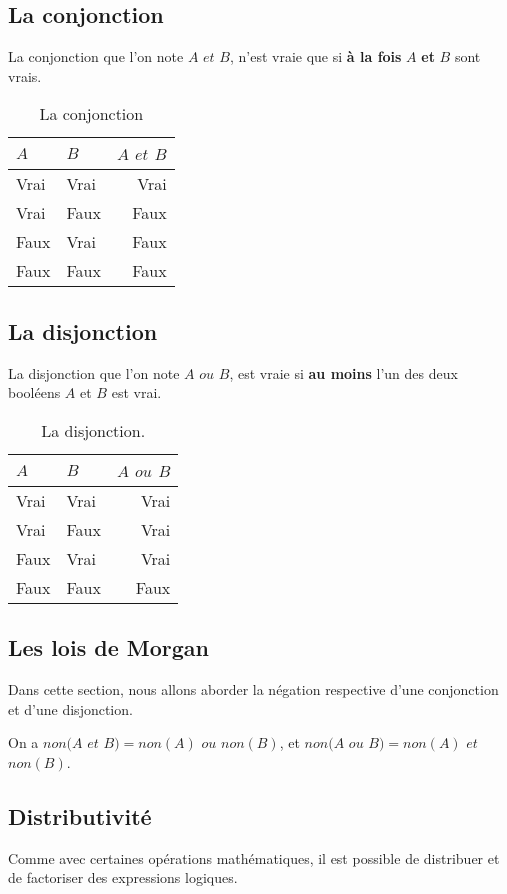 \subsection{La conjonction}
La conjonction que l'on note $A$ $et$ $B$, n'est vraie que si \textbf{à la fois} $A$ \textbf{et} $B$ sont vrais.
\begin{table}[h]
\centering
\begin{tabu} spread \linewidth {|l|l|r|}
\hline
$A$ & $B$ & $A$ $et$ $B$ \\ \hline
Vrai & Vrai & Vrai \\ \hline
Vrai & Faux & Faux \\ \hline
Faux & Vrai & Faux \\ \hline
Faux & Faux & Faux \\ \hline
\end{tabu}
\caption{La conjonction}
\end{table}
\subsection{La disjonction}
La disjonction que l'on note $A$ $ou$ $B$, est vraie si \textbf{au moins} l'un des deux booléens $A$ et $B$ est vrai.
\begin{table}[h]
\centering
\begin{tabu} spread \linewidth {|l|l|r|}
\hline
$A$ & $B$ & $A$ $ou$ $B$ \\ \hline
Vrai & Vrai & Vrai \\ \hline
Vrai & Faux & Vrai \\ \hline
Faux & Vrai & Vrai \\ \hline
Faux & Faux & Faux \\ \hline
\end{tabu}
\caption{La disjonction.}
\end{table}
\subsection{Les lois de Morgan}
Dans cette section, nous allons aborder la négation respective d'une conjonction et d'une disjonction.

On a $non(A$ $et$ $B) = non(A)$ $ou$ $non(B)$,
et $non(A$ $ou$ $B) = non(A)$ $et$ $non(B)$.

\subsection{Distributivité}
Comme avec certaines opérations mathématiques, il est possible de distribuer et de factoriser des expressions logiques.

